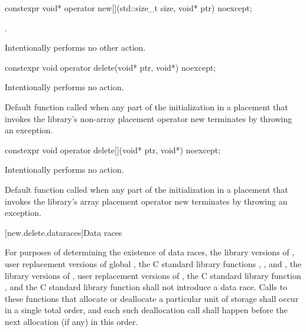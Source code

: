 %
\begin{itemdecl}
constexpr void* operator new[](std::size_t size, void* ptr) noexcept;
\end{itemdecl}

\begin{itemdescr}
\pnum
\returns
{}.

\pnum
\remarks
Intentionally performs no other action.
\end{itemdescr}

%
\begin{itemdecl}
constexpr void operator delete(void* ptr, void*) noexcept;
\end{itemdecl}

\begin{itemdescr}
\pnum
\effects
Intentionally performs no action.

\pnum
\remarks
Default function called when any part of the initialization in a
placement  that invokes the library's
non-array placement operator new
terminates by throwing an exception.
\end{itemdescr}

%
\begin{itemdecl}
constexpr void operator delete[](void* ptr, void*) noexcept;
\end{itemdecl}

\begin{itemdescr}
\pnum
\effects
Intentionally performs no action.

\pnum
\remarks
Default function called when any part of the initialization in a
placement  that invokes the library's
array placement operator new
terminates by throwing an exception.
\end{itemdescr}

[new.delete.dataraces]{Data races}

\pnum
For purposes of determining the existence of data races, the library versions
of , user replacement versions of global ,
the C standard library functions
, , and ,
the library
versions of , user replacement
versions of , the C standard library function
, and the C standard library function  shall not
introduce a data race.
Calls to these functions that allocate or deallocate a particular unit
of storage shall occur in a single total order, and each such deallocation call
shall happen before the next allocation (if any) in
this order.

